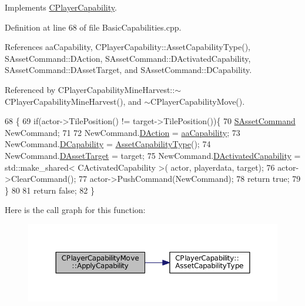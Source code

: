 Implements \hyperlink{classCPlayerCapability_a2ca6fd7fbd9c0178f1cf1d049c63825f}{C\+Player\+Capability}.



Definition at line 68 of file Basic\+Capabilities.\+cpp.



References aa\+Capability, C\+Player\+Capability\+::\+Asset\+Capability\+Type(), S\+Asset\+Command\+::\+D\+Action, S\+Asset\+Command\+::\+D\+Activated\+Capability, S\+Asset\+Command\+::\+D\+Asset\+Target, and S\+Asset\+Command\+::\+D\+Capability.



Referenced by C\+Player\+Capability\+Mine\+Harvest\+::$\sim$\+C\+Player\+Capability\+Mine\+Harvest(), and $\sim$\+C\+Player\+Capability\+Move().


\begin{DoxyCode}
68                                                                                                            
                                                        \{
69     \textcolor{keywordflow}{if}(actor->TilePosition() != target->TilePosition())\{
70         \hyperlink{structSAssetCommand}{SAssetCommand} NewCommand;
71         
72         NewCommand.\hyperlink{structSAssetCommand_a8edd3b3d59a76d5514ba403bc8076a75}{DAction} = \hyperlink{GameDataTypes_8h_ab47668e651a3032cfb9c40ea2d60d670acf9fb164e8abd71c71f4a8c7fda360d4}{aaCapability};
73         NewCommand.\hyperlink{structSAssetCommand_a734ea7c6847457b437360f333f570ff9}{DCapability} = \hyperlink{classCPlayerCapability_a433bb196cd6ab6a932f1cac102b3aa98}{AssetCapabilityType}();
74         NewCommand.\hyperlink{structSAssetCommand_a3d9b43f6e59c386c48c41a65448a0c39}{DAssetTarget} = target;
75         NewCommand.\hyperlink{structSAssetCommand_ad8beda19520811cc70fe1eab16c774dd}{DActivatedCapability} = std::make\_shared< CActivatedCapability >(
      actor, playerdata, target);
76         actor->ClearCommand();
77         actor->PushCommand(NewCommand);
78         \textcolor{keywordflow}{return} \textcolor{keyword}{true};
79     \}
80 
81     \textcolor{keywordflow}{return} \textcolor{keyword}{false};
82 \}
\end{DoxyCode}
Here is the call graph for this function\+:\nopagebreak
\begin{figure}[H]
\begin{center}
\leavevmode
\includegraphics[width=350pt]{classCPlayerCapabilityMove_ade3f4e72612cbf2ad73a6c2e6aa843df_cgraph}
\end{center}
\end{figure}

